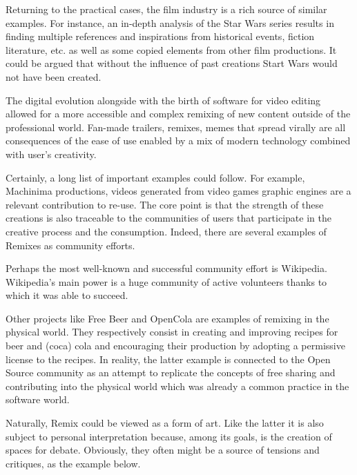 Returning to the practical cases, the film industry is a rich source of similar examples. For instance, an in-depth analysis of the Star Wars series results in finding multiple references and inspirations from historical events, fiction literature, etc. as well as some copied elements from other film productions. It could be argued that without the influence of past creations Start Wars would not have been created.

The digital evolution alongside with the birth of software for video editing allowed for a more accessible and complex remixing of new content outside of the professional world. Fan-made trailers, remixes, memes that spread virally are all consequences of the ease of use enabled by a mix of modern technology combined with user’s creativity.

Certainly, a long list of important examples could follow. For example, Machinima productions, videos generated from video games graphic engines are a relevant contribution to re-use.
The core point is that the strength of these creations is also traceable to the communities of users that participate in the creative process and the consumption. Indeed, there are several examples of Remixes as community efforts.

Perhaps the most well-known and successful community effort is Wikipedia. Wikipedia’s main power is a huge community of active volunteers thanks to which it was able to succeed.

Other projects like Free Beer and OpenCola are examples of remixing in the physical world. They respectively consist in creating and improving recipes for beer and (coca) cola and encouraging their production by adopting a permissive license to the recipes.
In reality, the latter example is connected to the Open Source community as an attempt to replicate the concepts of free sharing and contributing into the physical world which was already a common practice in the software world. 

Naturally, Remix could be viewed as a form of art. Like the latter it is also subject to personal interpretation because, among its goals, is the creation of spaces for debate. Obviously, they often might be a source of tensions and critiques, as the example below.


